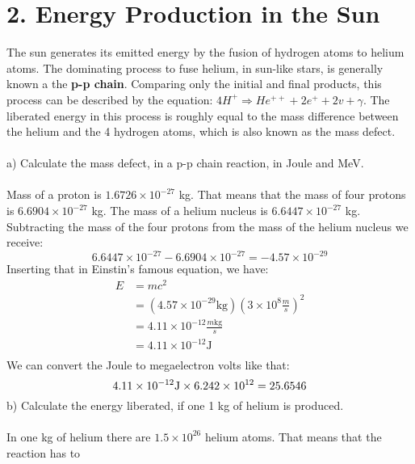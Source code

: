 \section*{2. Energy Production in the Sun}

The sun generates its emitted energy by the fusion of hydrogen atoms to helium atoms. The dominating 
process to fuse helium, in sun-like stars, is generally known a the \textbf{p-p chain}. Comparing only
the initial and final products, this process can be described by the equation: 
$4H^+ \Rightarrow He^{++} + 2e^+ + 2v + \gamma$. The liberated energy in this process is roughly equal
to the mass difference between the helium and the 4 hydrogen atoms, which is also known as the mass 
defect.\\
\\
a) Calculate the mass defect, in a p-p chain reaction, in Joule and MeV.\\
\\
Mass of a proton is $1.6726 \times 10^{-27}$ kg. That means that the mass of four protons is 
$6.6904 \times 10^{-27}$ kg. The mass of a helium nucleus is $6.6447 \times 10^{-27}$ kg. Subtracting
the mass of the four protons from the mass of the helium nucleus we receive:
\begin{equation*}
    6.6447 \times 10^{-27} - 6.6904 \times 10^{-27} = -4.57 \times 10^{-29}
\end{equation*}
Inserting that in Einstin's famous equation, we have:
\begin{equation*}
    \begin{split}
        E &= mc^2\\
          &= (4.57 \times 10^{-29} \text{kg})(3 \times 10^8 \frac{m}{s})^2\\
          &= 4.11 \times 10^{-12} \frac{m \text{kg}}{s}\\
          &= 4.11 \times 10^{-12} \text{J}\\
    \end{split}
\end{equation*}
We can convert the Joule to megaelectron volts like that:
\begin{equation*}
    4.11 \times 10^{-12} \text{J} \times 6.242 \times 10^{12} = 25.6546\\
\end{equation*}
b) Calculate the energy liberated, if one 1 kg of helium is produced.\\
\\
In one kg of helium there are $1.5 \times 10^{26}$ helium atoms. That means that the reaction has to
